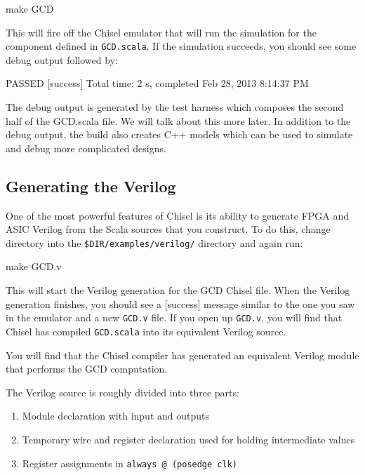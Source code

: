 \documentclass[twocolumn, 10pt]{article}
\begin{document}
\begin{bash}
make GCD
\end{bash}

\noindent
This will fire off the Chisel emulator that will run the simulation for the component defined in \verb+GCD.scala+. If the simulation succeeds, you should see some debug output followed by:
\begin{footnotesize}
\begin{bash}
PASSED
[success] Total time: 2 s, completed Feb 28, 2013 8:14:37 PM
\end{bash}
\end{footnotesize}

The debug output is generated by the test harness which composes the second half of the GCD.scala file. We will talk about this more later. In addition to the debug output, the build also creates C++ models which can be used to simulate and debug more complicated designs.

\subsection{Generating the Verilog}

One of the most powerful features of Chisel is its ability to generate FPGA and ASIC Verilog from the Scala sources that you construct. To do this, change directory into the \verb+$DIR/examples/verilog/+ directory and again run:
\begin{bash}
make GCD.v
\end{bash}
This will start the Verilog generation for the GCD Chisel file. When the Verilog generation finishes, you should see a [success] message similar to the one you saw in the emulator and a new \verb+GCD.v+ file. If you open up \verb+GCD.v+, you will find that Chisel has compiled \verb+GCD.scala+ into its equivalent Verilog source.

You will find that the Chisel compiler has generated an equivalent Verilog module that performs the GCD computation.

The Verilog source is roughly divided into three parts:
\begin{enumerate}
\item Module declaration with input and outputs
\item Temporary wire and register declaration used for holding intermediate values
\item Register assignments in \verb+always @ (posedge clk)+
\end{enumerate}
\end{document}
